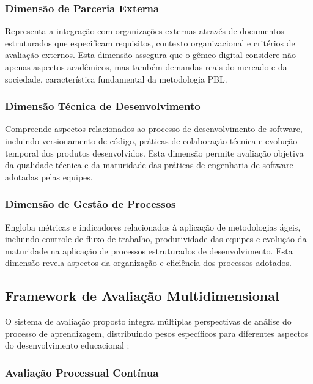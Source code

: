 \documentclass[12pt,a4paper]{article}
\begin{document}
\subsubsection{Dimensão de Parceria Externa}

Representa a integração com organizações externas através de documentos estruturados que especificam requisitos, contexto organizacional e critérios de avaliação externos. Esta dimensão assegura que o gêmeo digital considere não apenas aspectos acadêmicos, mas também demandas reais do mercado e da sociedade, característica fundamental da metodologia PBL.

\subsubsection{Dimensão Técnica de Desenvolvimento}

Compreende aspectos relacionados ao processo de desenvolvimento de software, incluindo versionamento de código, práticas de colaboração técnica e evolução temporal dos produtos desenvolvidos. Esta dimensão permite avaliação objetiva da qualidade técnica e da maturidade das práticas de engenharia de software adotadas pelas equipes.

\subsubsection{Dimensão de Gestão de Processos}

Engloba métricas e indicadores relacionados à aplicação de metodologias ágeis, incluindo controle de fluxo de trabalho, produtividade das equipes e evolução da maturidade na aplicação de processos estruturados de desenvolvimento. Esta dimensão revela aspectos da organização e eficiência dos processos adotados.

\subsection{Framework de Avaliação Multidimensional}

O sistema de avaliação proposto integra múltiplas perspectivas de análise do processo de aprendizagem, distribuindo pesos específicos para diferentes aspectos do desenvolvimento educacional \cite{inteli2024}:

\subsubsection{Avaliação Processual Contínua}
\end{document}
